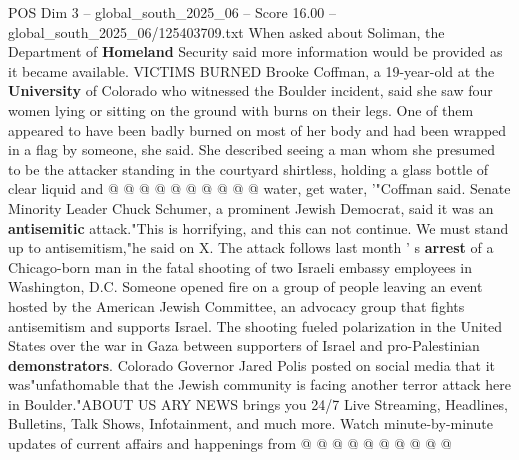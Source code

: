 \begin{textsample}{POS Dim 3 – global\_south\_2025\_06 – Score 16.00 – global\_south\_2025\_06/125403709.txt}
When asked about Soliman, the Department of \textbf{Homeland} Security said more information would be provided as it became available.
VICTIMS BURNED Brooke Coffman, a 19-year-old at the \textbf{University} of Colorado who witnessed the Boulder incident, said she saw four women lying or sitting on the ground with burns on their legs.
One of them appeared to have been badly burned on most of her body and had been wrapped in a flag by someone, she said.
She described seeing a man whom she presumed to be the attacker standing in the courtyard shirtless, holding a glass bottle of clear liquid and @ @ @ @ @ @ @ @ @ @ water, get water, '"Coffman said.
Senate Minority Leader Chuck Schumer, a prominent Jewish Democrat, said it was an \textbf{antisemitic} attack."This is horrifying, and this can not continue.
We must stand up to antisemitism,"he said on X.
The attack follows last month ' s \textbf{arrest} of a Chicago-born man in the fatal shooting of two Israeli embassy employees in Washington, D.C.
Someone opened fire on a group of people leaving an event hosted by the American Jewish Committee, an advocacy group that fights antisemitism and supports Israel.
The shooting fueled polarization in the United States over the war in Gaza between supporters of Israel and pro-Palestinian \textbf{demonstrators}.
Colorado Governor Jared Polis posted on social media that it was"unfathomable that the Jewish community is facing another terror attack here in Boulder."ABOUT US ARY NEWS brings you 24/7 Live Streaming, Headlines, Bulletins, Talk Shows, Infotainment, and much more.
Watch minute-by-minute updates of current affairs and happenings from @ @ @ @ @ @ @ @ @ @

\end{textsample}
